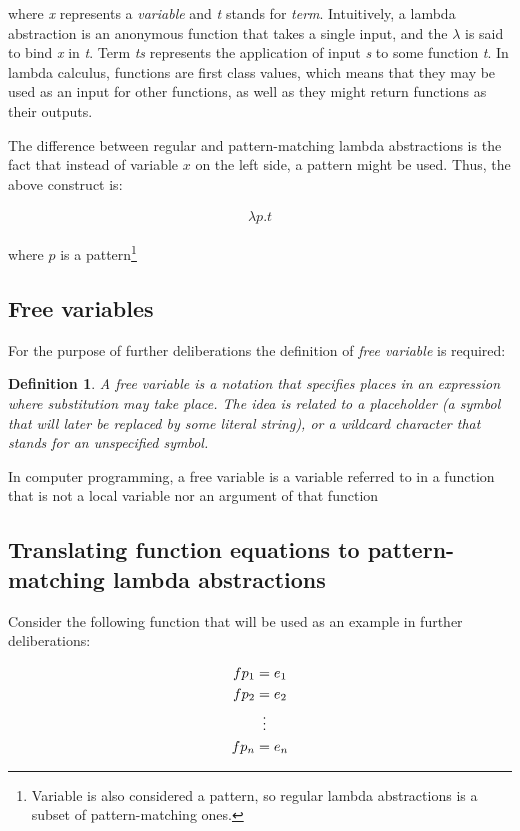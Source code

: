 \documentclass[12pt,a4paper]{report}
\newtheorem{definition}{Definition}[chapter]
\begin{document}
where \textit{x} represents a \textit{variable} and \textit{t} stands for
\textit{term}. Intuitively, a lambda abstraction is an anonymous function that
takes a single input, and the \(\lambda\) is said to bind \textit{x} in
\textit{t}. Term \textit{ts} represents the application of input \textit{s} to
some function \textit{t}. In lambda calculus, functions are first class values,
which means that they may be used as an input for other functions, as well as
they might return functions as their outputs.

The difference between regular and pattern-matching lambda abstractions is the
fact that instead of variable $x$ on the left side, a pattern might be used.
Thus, the above construct is:

\vspace{-0.2in}
\begin{align*}
\lambda p.t
\end{align*}


where $p$ is a pattern\footnote{Variable is also considered a pattern, so
regular lambda abstractions is a subset of pattern-matching ones.}

\subsection{Free variables}
\label{sec:free_variable}

For the purpose of further deliberations the definition of \textit{free
variable} is required:
\begin{definition}
  \label{def:free_variable}
  A free variable is a notation that specifies places in an expression where
  substitution may take place. The idea is related to a placeholder (a symbol
  that will later be replaced by some literal string), or a wildcard character
  that stands for an unspecified symbol.
\end{definition}

In computer programming, a free variable is a variable referred to in a
function that is not a local variable nor an argument of that function

\subsection{Translating function equations to pattern-matching lambda
abstractions}
Consider the following function that will be used as an example in further
deliberations:

\vspace{-0.2in}
\begin{align*}
f p_{1} &= e_{1}\\
f p_{2} &= e_{2}\\
        &\mathrel{\makebox[\widthof{=}]{\vdots}} \\
f p_{n} &= e_{n}
\end{align*}
\end{document}
